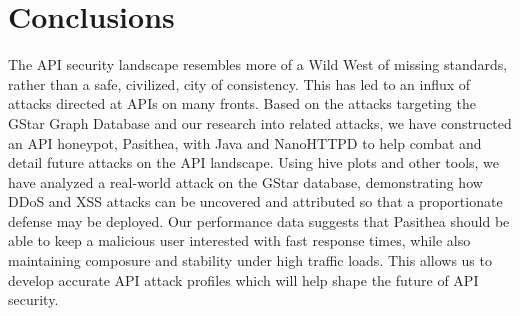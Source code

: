 
\section{Conclusions} \label{conclusions}

The API security landscape resembles more of a Wild West of missing standards, rather than a safe, civilized, city of consistency. This has led to an influx of attacks directed at APIs on many  fronts. Based on the attacks targeting the GStar Graph Database and our research into related attacks, we have constructed an API honeypot, Pasithea, with Java and NanoHTTPD to help combat and detail future attacks on the API landscape. Using hive plots and other tools, we have analyzed a real-world attack on the GStar database, demonstrating how DDoS and XSS attacks can be uncovered and attributed so that a proportionate defense may be deployed.  Our performance data suggests that Pasithea should be able to keep a malicious user interested with fast response times, while also maintaining composure and stability under high traffic loads. This allows us to develop accurate API attack profiles which will help shape the future of API security.
